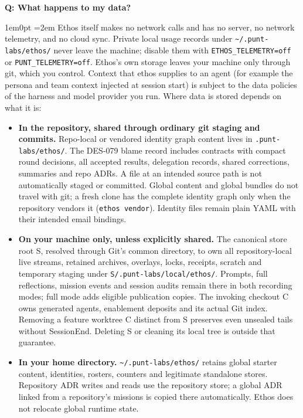 \documentclass[11pt,letterpaper]{article}
\newcommand{\fpath}[1]{\nolinkurl{#1}}
\newcounter{faqnum}
\newenvironment{faqpair}[1]{%
  \needspace{4\baselineskip}%
  \vspace{0.5em}%
  \refstepcounter{faqnum}%
  \noindent\textbf{\color{SectionBlue}Q\thefaqnum: #1}\par\nopagebreak[4]%
  \vspace{0.2em}%
  \begin{adjustwidth}{1em}{0pt}%
  \setlength{\parindent}{0pt}%
  \emergencystretch=2em%
}{%
  \end{adjustwidth}%
  \vspace{0.5em}%
}
\begin{document}
\begin{faqpair}{What happens to my data?}\label{faq:data}
Ethos itself makes no network calls and has no server, no network telemetry, and no cloud sync. Private local usage records under {\small\texttt{\textasciitilde/.punt-labs/ethos/}} never leave the machine; disable them with {\small\texttt{ETHOS\_TELEMETRY=off}} or {\small\texttt{PUNT\_TELEMETRY=off}}. Ethos's own storage leaves your machine only through git, which you control. Context that ethos supplies to an agent (for example the persona and team context injected at session start) is subject to the data policies of the harness and model provider you run. Where data is stored depends on what it is:

\begin{itemize}[nosep]
  \item \textbf{In the repository, shared through ordinary git staging and commits.} Repo-local or vendored identity graph content lives in {\small\texttt{.punt-labs/ethos/}}. The DES-079 blame record includes contracts with compact round decisions, all accepted results, delegation records, shared corrections, summaries and repo ADRs. A file at an intended source path is not automatically staged or committed. Global content and global bundles do not travel with git; a fresh clone has the complete identity graph only when the repository vendors it ({\small\texttt{ethos vendor}}). Identity files remain plain YAML with their intended email bindings.
   \item \textbf{On your machine only, unless explicitly shared.} The canonical store root S, resolved through Git's common directory, to own all repository-local live streams, retained archives, overlays, locks, receipts, scratch and temporary staging under {\small\fpath{S/.punt-labs/local/ethos/}}. Prompts, full reflections, mission events and session audits remain there in both recording modes; full mode adds eligible publication copies. The invoking checkout C owns generated agents, enablement deposits and its actual Git index. Removing a feature worktree C distinct from S preserves even unsealed tails without SessionEnd. Deleting S or cleaning its local tree is outside that guarantee.
  \item \textbf{In your home directory.} {\small\texttt{\textasciitilde/.punt-labs/ethos/}} retains global starter content, identities, rosters, counters and legitimate standalone stores. Repository ADR writes and reads use the repository store; a global ADR linked from a repository's missions is copied there automatically. Ethos does not relocate global runtime state.
\end{itemize}


\end{faqpair}
\end{document}
